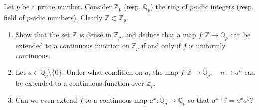 \begin{exercise}
\label{algebra:2024:5}
Let $p$ be a prime number. Consider $\mathbb{Z}_p$ (resp. $\mathbb{Q}_p$) the ring of $p$-adic integers (resp. field of $p$-adic numbers). Clearly $\mathbb{Z} \subset \mathbb{Z}_p$.

\begin{enumerate}
\item[(1)] Show that the set $\mathbb{Z}$ is dense in $\mathbb{Z}_p$, and deduce that a map $f: \mathbb{Z} \to \mathbb{Q}_p$ can be extended to a continuous function on $\mathbb{Z}_p$ if and only if $f$ is uniformly continuous.

\item[(2)] Let $a \in \mathbb{Q}_p \setminus \{0\}$. Under what condition on $a$, the map $f: \mathbb{Z} \to \mathbb{Q}_p, \quad n \mapsto a^n$ can be extended to a continuous function over $\mathbb{Z}_p$.

\item[(3)] Can we even extend $f$ to a continuous map $a^x: \mathbb{Q}_p \to \mathbb{Q}_p$ so that $a^{x+y} = a^x a^y$?
\end{enumerate}
\end{exercise}

